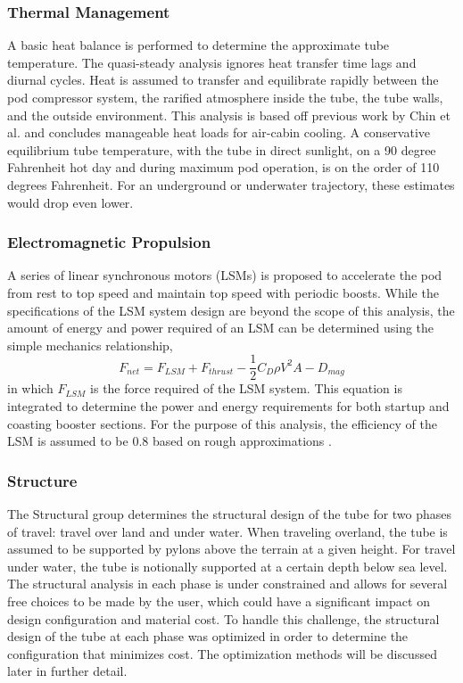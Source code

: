 \subsubsection{Thermal Management}
	A basic heat balance is performed to determine the approximate tube
	temperature. The quasi-steady analysis ignores heat transfer time lags and
	diurnal cycles. Heat is assumed to transfer and equilibrate rapidly
	between the pod compressor system, the rarified atmosphere inside the
	tube, the tube walls, and the outside environment. This analysis is
	based off previous work by Chin et al.\cite{Chin} and concludes manageable heat
	loads for air-cabin cooling. A conservative equilibrium tube temperature,
	with the tube in direct sunlight, on a 90 degree Fahrenheit hot day and
	during maximum pod operation, is on the order of 110 degrees Fahrenheit.
	For an underground or underwater trajectory, these estimates would drop even lower.
\subsubsection{Electromagnetic Propulsion}
	A series of linear synchronous motors (LSMs) is proposed to accelerate the
	pod from rest to top speed and maintain top speed with periodic boosts.
	While the specifications of the LSM system design are beyond the scope of
	this analysis, the amount of energy and power required of an LSM can be
	determined using the simple mechanics relationship,
	\begin{equation}
		\label{eq:sum_of_forces}
		F_{net} = F_{LSM} + F_{thrust} - \frac{1}{2}C_{D}\rho V^{2}A - D_{mag}
	\end{equation}
	in which $F_{LSM}$ is the force required of the LSM system. This equation
	is integrated to determine the power and energy requirements for both
	startup and coasting booster sections. For the purpose of this analysis,
	the efficiency of the LSM is assumed to be 0.8 based on rough approximations \cite{LSM}.
\subsubsection{Structure}
	The Structural group determines the structural design of the tube
	for two phases of travel: travel over land and under water. When traveling
	overland, the tube is assumed to be supported by pylons above the terrain
	at a given height. For travel under water, the tube is notionally
	supported at a certain depth below sea level. The structural analysis in
	each phase is under constrained and allows for several free choices to be
	made by the user, which could have a significant impact on design
	configuration and material cost. To handle this challenge, the structural
	design of the tube at each phase was optimized in order to determine
	the configuration that minimizes cost. The optimization methods will be
	discussed later in further detail.

